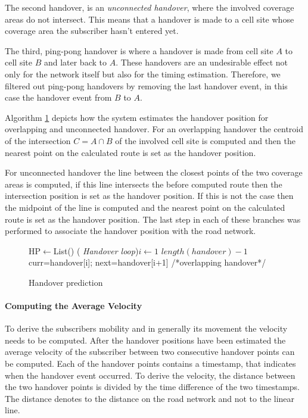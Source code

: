 \documentclass[twocolumn]{bmcart}%
\makeatletter
\newcommand{\removelatexerror}{\let\@latex@error\@gobble}
\makeatother
\begin{document}
The second handover, is an \emph{unconnected handover}, where the involved coverage areas do not intersect. This means that a handover is made to a cell site whose coverage area the subscriber hasn't entered yet.

The third, ping-pong handover is where a handover is made from cell site $A$ to cell site $B$ and later back to $A$. These handovers are an undesirable effect not only for the network itself but also for the timing estimation. Therefore, we filtered out ping-pong handovers by removing the last handover event, in this case the handover event from $B$ to $A$.

Algorithm \ref{alg:prediction} depicts how the system estimates the handover position for overlapping and unconnected handover. For an overlapping handover the centroid of the intersection $C=A \cap B$ of the involved cell site is computed and then the nearest point on the calculated route is set as the handover position. 

For unconnected handover the line between the closest points of the two coverage areas is computed, if this line intersects the before computed route then the intersection position is set as the handover position. If this is not the case then the midpoint of the line is computed and the nearest point on the calculated route is set as the handover position. The last step in each of these branches was performed to associate the handover position with the road network.
\SetAlFnt{\tiny}

\begin{figure}[!t]
	\removelatexerror
	\begin{algorithm}[H]
		\caption{Handover prediction}
		\label{alg:prediction}
		HP$\leftarrow$List()\;
		\For( \emph{Handover loop}){$i\leftarrow 1$ \KwTo $length(handover)-1$}
		{
			curr=handover[i]; next=handover[i+1]\;
			/*overlapping handover*/\\
		}
	\end{algorithm}
\end{figure}

\paragraph{Computing the Average Velocity}
To derive the subscribers mobility and in generally its movement the velocity needs to be computed. 
After the handover positions have been estimated the average velocity of the subscriber between two consecutive handover points can be computed. 
Each of the handover points contains a timestamp, that indicates when the handover event occurred. To derive the velocity, the distance between the two handover points is divided by the time difference of the two timestamps. The distance denotes to the distance on the road network and not to the linear line. 
\end{document}
